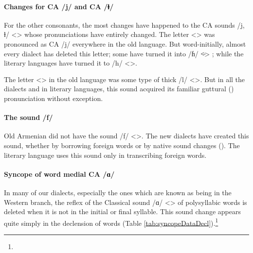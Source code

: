 \paragraph{Changes for CA /j/ and CA /ɫ/}\label{sec:AdjarianIntro:difference:soundChange:VelarGlide}

For the other consonants, the most changes have happened to the CA sounds /j, ɫ/ <> whose pronunciations have entirely changed. The letter <> was pronounced as CA /j/ everywhere in the old language. But word-initially, almost every dialect has deleted this letter; some have turned it into /ɦ/ <̵> ; while the literary languages have turned it to /h/ <>. 

The letter <> in the old language was some type of thick /l/ <>. But in all the dialects and in literary languages, this sound acquired its familiar guttural () pronunciation without exception. 


\paragraph{The sound /f/}

Old Armenian did not have the sound /f/ <>. The new dialects have created this sound, whether by borrowing foreign words or by native sound changes (). The literary language uses this sound only in transcribing foreign words. 

\paragraph{Syncope of word medial CA /ɑ/}

In many of our dialects, especially the ones which are known as being in the Western branch, the reflex of the Classical sound /ɑ/ <> of polysyllabic words is deleted when it is not in the initial or final syllable. This sound change appears quite simply in the declension of words (Table \ref{tab:syncopeDataDecl}).\footnote{}


